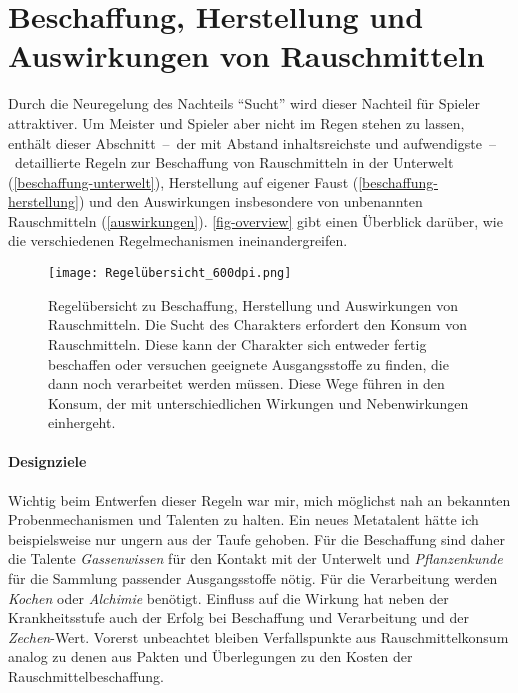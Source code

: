 \section{Beschaffung, Herstellung und Auswirkungen von Rauschmitteln}
Durch die Neuregelung des Nachteils \enquote{Sucht} wird dieser Nachteil für Spieler attraktiver. Um Meister und Spieler aber nicht im Regen stehen zu lassen, enthält dieser Abschnitt~--~der mit Abstand inhaltsreichste und aufwendigste~--~detaillierte Regeln zur Beschaffung von Rauschmitteln in der Unterwelt (\vref{beschaffung-unterwelt}), Herstellung auf eigener Faust (\vref{beschaffung-herstellung}) und den Auswirkungen insbesondere von unbenannten Rauschmitteln (\vref{auswirkungen}). \vref{fig-overview} gibt einen Überblick darüber, wie die verschiedenen Regelmechanismen ineinandergreifen.

\begin{figure}
	\begin{center}
		\texttt{[image: Regelübersicht\_600dpi.png]}
		\caption[Regelübersicht zu Beschaffung, Herstellung und Auswirkungen von Rauschmitteln]{Regelübersicht zu Beschaffung, Herstellung und Auswirkungen von Rauschmitteln. Die Sucht des Charakters erfordert den Konsum von Rauschmitteln. Diese kann der Charakter sich entweder fertig beschaffen oder versuchen geeignete Ausgangsstoffe zu finden, die dann noch verarbeitet werden müssen. Diese Wege führen in den Konsum, der mit unterschiedlichen Wirkungen und Nebenwirkungen einhergeht.\label{fig-overview}}
	\end{center}
\end{figure}

\paragraph{Designziele}
Wichtig beim Entwerfen dieser Regeln war mir, mich möglichst nah an bekannten Probenmechanismen und Talenten zu halten. Ein neues Metatalent hätte ich beispielsweise nur ungern aus der Taufe gehoben. Für die Beschaffung sind daher die Talente \emph{Gassenwissen} für den Kontakt mit der Unterwelt und \emph{Pflanzenkunde} für die Sammlung passender Ausgangsstoffe nötig. Für die Verarbeitung werden \emph{Kochen} oder \emph{Alchimie} benötigt. Einfluss auf die Wirkung hat neben der Krankheitsstufe auch der Erfolg bei Beschaffung und Verarbeitung und der \emph{Zechen}-Wert. Vorerst unbeachtet bleiben Verfallspunkte aus Rauschmittelkonsum analog zu denen aus Pakten \cite[S.~390]{WdZ} und Überlegungen zu den Kosten der Rauschmittelbeschaffung.

